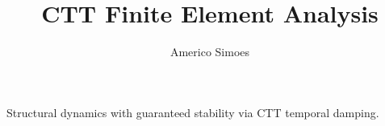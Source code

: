\documentclass[12pt]{article}
\begin{document}
\title{CTT Finite Element Analysis}
\author{Americo Simoes}
\maketitle
Structural dynamics with guaranteed stability via CTT temporal damping.
\end{document}
